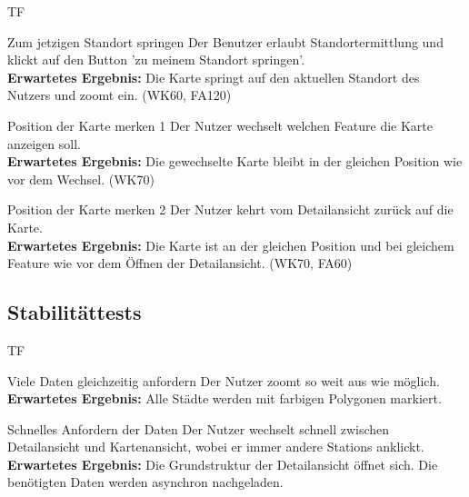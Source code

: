 \begin{Kriterien}{TF}
	\item[Zum jetzigen Standort springen] Der Benutzer erlaubt Standortermittlung und klickt auf den Button  'zu meinem Standort springen'. \\ \textbf{Erwartetes Ergebnis:} Die Karte springt auf den aktuellen Standort des Nutzers und zoomt ein. (WK60, FA120)
	
	\item[Position der Karte merken 1] Der Nutzer wechselt welchen Feature die Karte anzeigen soll. \\ 
	\textbf{Erwartetes Ergebnis:} Die gewechselte Karte bleibt in der gleichen Position wie vor dem Wechsel. (WK70)
	
	\item[Position der Karte merken 2] Der Nutzer kehrt vom Detailansicht zurück auf die Karte. \\ 
	\textbf{Erwartetes Ergebnis:} Die Karte ist an der gleichen Position und bei gleichem Feature wie vor dem Öffnen der \gls{Detailansicht}. (WK70, FA60)
	
\end{Kriterien}
\subsection{Stabilitättests}
\begin{Kriterien}{TF}

	\item[Viele Daten gleichzeitig anfordern] Der Nutzer zoomt so weit aus wie möglich.\\ \textbf{Erwartetes Ergebnis:} Alle Städte werden mit farbigen Polygonen markiert.

	\item[Schnelles Anfordern der Daten] Der Nutzer wechselt schnell zwischen Detailansicht und Kartenansicht, wobei er immer andere \glspl{Station} anklickt. \\ \textbf{Erwartetes Ergebnis:} Die Grundstruktur der Detailansicht öffnet sich. 
	Die benötigten Daten werden asynchron nachgeladen.

\end{Kriterien}
